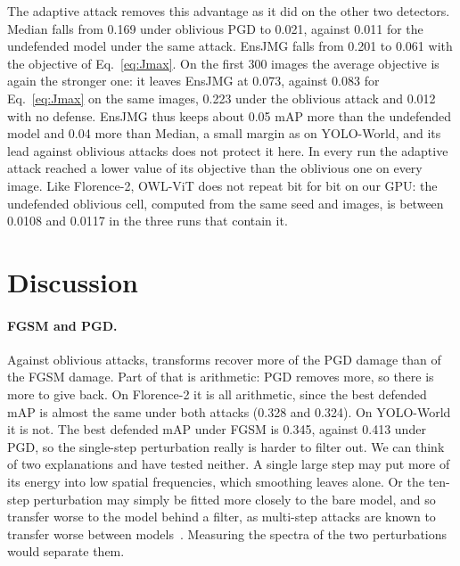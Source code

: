 \documentclass[11pt]{article}
\newcommand{\yw}{YOLO-World}
\newcommand{\fl}{Florence-2}
\begin{document}
The adaptive attack removes this advantage as it did on the other two
detectors. Median falls from 0.169 under oblivious PGD to 0.021, against
0.011 for the undefended model under the same attack. EnsJMG falls from
0.201 to 0.061 with the objective of Eq.~\ref{eq:Jmax}. On the first 300
images the average objective is again the stronger one: it leaves EnsJMG at
0.073, against 0.083 for Eq.~\ref{eq:Jmax} on the same images, 0.223 under the
oblivious attack and 0.012 with no defense. EnsJMG thus keeps about 0.05 mAP
more than the undefended model and 0.04 more than Median, a small margin as
on \yw{}, and its lead against oblivious attacks does not protect it here. In every run the adaptive attack reached a lower
value of its objective than the oblivious one on every image. Like \fl{},
OWL-ViT does not repeat bit for bit on our GPU: the undefended oblivious
cell, computed from the same seed and images, is between 0.0108 and 0.0117
in the three runs that contain it.

\section{Discussion}

\paragraph{FGSM and PGD.} Against oblivious attacks, transforms recover more
of the PGD damage than of the FGSM damage. Part of that is arithmetic: PGD
removes more, so there is more to give back. On \fl{} it is all arithmetic,
since the best defended mAP is almost the same under both attacks (0.328 and
0.324).
On \yw{} it is not. The best defended mAP under FGSM is 0.345, against 0.413
under PGD, so the single-step perturbation really is harder to filter out.
We can think of two explanations and have tested neither. A single large
step may put more of its energy into low spatial frequencies, which
smoothing leaves alone. Or the ten-step perturbation may simply be fitted
more closely to the bare model, and so transfer worse to the model behind a
filter, as multi-step attacks are known to transfer worse between
models~\cite{kurakin2017adversarial}. Measuring the spectra of the two
perturbations would separate them.
\end{document}
